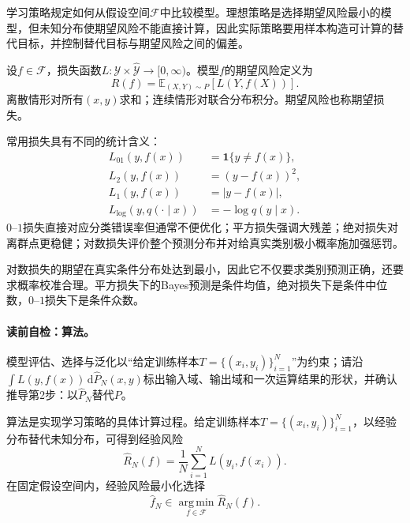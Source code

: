 学习策略规定如何从假设空间$\mathcal F$中比较模型。理想策略是选择期望风险最小的模型，但未知分布使期望风险不能直接计算，因此实际策略要用样本构造可计算的替代目标，并控制替代目标与期望风险之间的偏差。

\label{struct:V1-C10-CH07}
\begin{definition}[损失函数与期望风险]
设$f\in\mathcal F$，损失函数$L:\mathcal Y\times\widehat{\mathcal Y}\to[0,\infty)$。模型$f$的期望风险定义为
\[
R(f)=\mathbb E_{(X,Y)\sim P}\!\left[L(Y,f(X))\right].
\]
离散情形对所有$(x,y)$求和；连续情形对联合分布积分。期望风险也称期望损失。
\end{definition}

常用损失具有不同的统计含义：
\[
\begin{aligned}
L_{01}(y,f(x))&=\mathbf 1\{y\ne f(x)\},\\
L_2(y,f(x))&=(y-f(x))^2,\\
L_1(y,f(x))&=|y-f(x)|,\\
L_{\log}(y,q(\cdot\mid x))&=-\log q(y\mid x).
\end{aligned}
\]
$0$--$1$损失直接对应分类错误率但通常不便优化；平方损失强调大残差；绝对损失对离群点更稳健；对数损失评价整个预测分布并对给真实类别极小概率施加强惩罚。

\begin{probabilitybox}
对数损失的期望在真实条件分布处达到最小，因此它不仅要求类别预测正确，还要求概率校准合理。平方损失下的Bayes预测是条件均值，绝对损失下是条件中位数，$0$--$1$损失下是条件众数。
\end{probabilitybox}


\paragraph{读前自检：算法。}模型评估、选择与泛化以“给定训练样本$T=\{(x_i,y_i)\}_{i=1}^N$”为约束；请沿$\int L(y,f(x))\,\mathrm d\widehat P_N(x,y)$标出输入域、输出域和一次运算结果的形状，并确认推导第2步：以$\widehat P_N$替代$P$。\par

算法是实现学习策略的具体计算过程。给定训练样本$T=\{(x_i,y_i)\}_{i=1}^N$，以经验分布替代未知分布，可得到经验风险
\[
\widehat R_N(f)=\frac1N\sum_{i=1}^N L(y_i,f(x_i)).
\]
在固定假设空间内，经验风险最小化选择
\[
\widehat f_N\in\operatorname*{arg\,min}_{f\in\mathcal F}\widehat R_N(f).
\]

